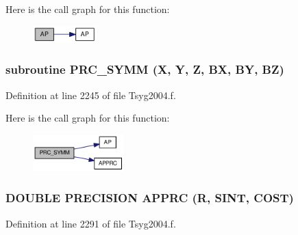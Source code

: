 Here is the call graph for this function:\nopagebreak
\begin{figure}[H]
\begin{center}
\leavevmode
\includegraphics[width=70pt]{_tsyg2004_8f_6241cc7194479481c6845fe9216f73f9_cgraph}
\end{center}
\end{figure}
\hypertarget{_tsyg2004_8f_e5d2a482ea368498294fcc6bedc734ad}{
\subsubsection[{PRC\_\-SYMM}]{\setlength{\rightskip}{0pt plus 5cm}subroutine PRC\_\-SYMM (X, \/  Y, \/  Z, \/  BX, \/  BY, \/  BZ)}}
\label{_tsyg2004_8f_e5d2a482ea368498294fcc6bedc734ad}




Definition at line 2245 of file Tsyg2004.f.

Here is the call graph for this function:\nopagebreak
\begin{figure}[H]
\begin{center}
\leavevmode
\includegraphics[width=100pt]{_tsyg2004_8f_e5d2a482ea368498294fcc6bedc734ad_cgraph}
\end{center}
\end{figure}
\hypertarget{_tsyg2004_8f_d97fe9780c85165cf3d5efc106ad9f0e}{
\subsubsection[{APPRC}]{\setlength{\rightskip}{0pt plus 5cm}DOUBLE PRECISION APPRC (R, \/  SINT, \/  COST)}}
\label{_tsyg2004_8f_d97fe9780c85165cf3d5efc106ad9f0e}




Definition at line 2291 of file Tsyg2004.f.


